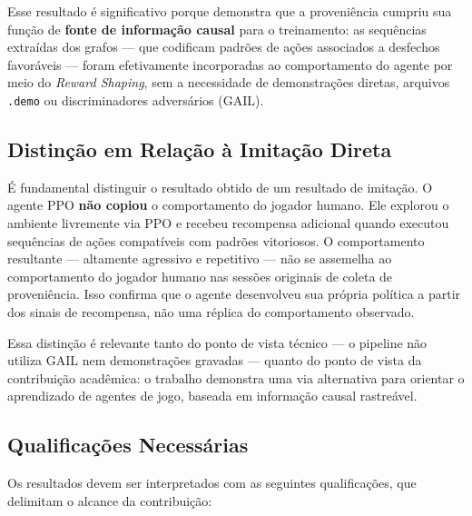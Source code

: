 Esse resultado é significativo porque demonstra que a proveniência cumpriu
sua função de \textbf{fonte de informação causal} para o treinamento: as
sequências extraídas dos grafos --- que codificam padrões de ações associados
a desfechos favoráveis --- foram efetivamente incorporadas ao comportamento
do agente por meio do \textit{Reward Shaping}, sem a necessidade de
demonstrações diretas, arquivos \texttt{.demo} ou discriminadores adversários
(GAIL).

\subsection{Distinção em Relação à Imitação Direta}
\label{subsec:distincao-imitacao}

É fundamental distinguir o resultado obtido de um resultado de imitação. O
agente PPO \textbf{não copiou} o comportamento do jogador humano. Ele
explorou o ambiente livremente via PPO e recebeu recompensa adicional quando
executou sequências de ações compatíveis com padrões vitoriosos. O
comportamento resultante --- altamente agressivo e repetitivo --- não se
assemelha ao comportamento do jogador humano nas sessões originais de coleta
de proveniência. Isso confirma que o agente desenvolveu sua própria política
a partir dos sinais de recompensa, não uma réplica do comportamento observado.

Essa distinção é relevante tanto do ponto de vista técnico --- o pipeline não
utiliza GAIL \cite{ho2016gail} nem demonstrações gravadas --- quanto do ponto
de vista da contribuição acadêmica: o trabalho demonstra uma via alternativa
para orientar o aprendizado de agentes de jogo, baseada em informação causal
rastreável.

\subsection{Qualificações Necessárias}
\label{subsec:qualificacoes}

Os resultados devem ser interpretados com as seguintes qualificações, que
delimitam o alcance da contribuição:

